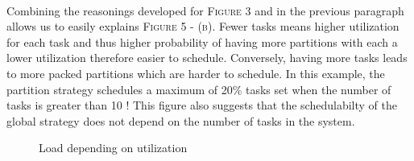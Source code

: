 \documentclass[a4paper]{article}
\begin{document}
\paragraph{}
Combining the reasonings developed for \textsc{Figure 3} and in the previous paragraph allows us to easily explains \textsc{Figure 5 - (b)}. Fewer tasks means higher utilization for each task and thus higher probability of having more partitions with each a lower utilization therefore easier to schedule. Conversely, having more tasks leads to more packed partitions which are harder to schedule. In this example, the partition strategy schedules a maximum of 20\% tasks set when the number of tasks is greater than 10 ! This figure also suggests that the schedulabilty of the global strategy does not depend on the number of tasks in the system.

\begin{figure}[H]
  \centering
  \hfill
  \caption{Load depending on utilization}
\end{figure}
\end{document}
